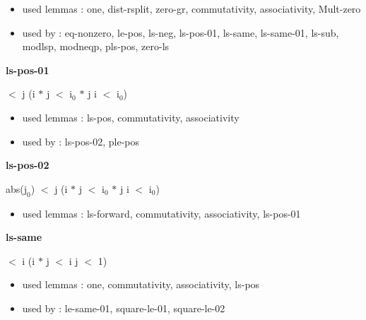 \documentclass[a4paper]{article}
\begin{document}
\begin{itemize}


\item       used lemmas  : one, dist-rsplit, zero-gr, commutativity, associativity, Mult-zero
\item       used by      : eq-nonzero, le-pos, ls-neg, ls-pos-01, ls-same, ls-same-01, ls-sub, modlsp, modneqp, pls-pos, zero-ls

\end{itemize}

\medskip

\bigskip

{\large\bf ls-pos-01}

\medskip

  $<$ j \Imp (i $*$ j $<$ $\mbox{i}_{0}$ $*$ j \Equiv i $<$ $\mbox{i}_{0}$)

\begin{itemize}


\item       used lemmas  : ls-pos, commutativity, associativity
\item       used by      : ls-pos-02, ple-pos

\end{itemize}

\medskip

\bigskip

{\large\bf ls-pos-02}

\medskip

 \Fol abs($\mbox{j}_{0}$) $<$ j \Imp (i $*$ j $<$ $\mbox{i}_{0}$ $*$ j \Equiv i $<$ $\mbox{i}_{0}$)

\begin{itemize}


\item       used lemmas  : ls-forward, commutativity, associativity, ls-pos-01

\end{itemize}

\medskip

\bigskip

{\large\bf ls-same}

\medskip

  $<$ i \Imp (i $*$ j $<$ i \Equiv j $<$ 1)

\begin{itemize}


\item       used lemmas  : one, commutativity, associativity, ls-pos
\item       used by      : le-same-01, square-le-01, square-le-02

\end{itemize}
\end{document}

